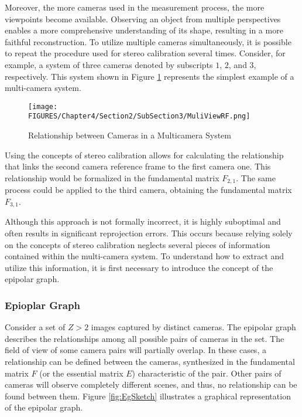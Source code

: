 Moreover, the more cameras used in the measurement process, the more viewpoints become available. Observing an object from multiple perspectives enables a more comprehensive understanding of its shape, resulting in a more faithful reconstruction.  
To utilize multiple cameras simultaneously, it is possible to repeat the procedure used for stereo calibration several times.
Consider, for example, a system of three cameras denoted by subscripts $1$, $2$, and $3$, respectively. This system shown in Figure \ref{fig:MuliViewRF} represents the simplest example of a multi-camera system.

\begin{figure}[!h]
  \centering
  \texttt{[image: FIGURES/Chapter4/Section2/SubSection3/MuliViewRF.png]}
  \caption{Relationship between Cameras in a Multicamera System}
  \label{fig:MuliViewRF}  
\end{figure}

Using the concepts of stereo calibration allows for calculating the relationship that links the second camera reference frame to the first camera one. This relationship would be formalized in the fundamental matrix $F_{2,1}$. The same process could be applied to the third camera, obtaining the fundamental matrix $F_{3,1}$.

Although this approach is not formally incorrect, it is highly suboptimal and often results in significant reprojection errors. This occurs because relying solely on the concepts of stereo calibration neglects several pieces of information contained within the multi-camera system. To understand how to extract and utilize this information, it is first necessary to introduce the concept of the epipolar graph.

\subsubsection{Epioplar Graph}

Consider a set of $Z > 2$ images captured by distinct cameras. The epipolar graph describes the relationships among all possible pairs of cameras in the set.  
The field of view of some camera pairs will partially overlap. In these cases, a relationship can be defined between the cameras, synthesized in the fundamental matrix $F$ (or the essential matrix $E$) characteristic of the pair.  
Other pairs of cameras will observe completely different scenes, and thus, no relationship can be found between them.  
Figure \ref{fig:EgSketch} illustrates a graphical representation of the epipolar graph.

